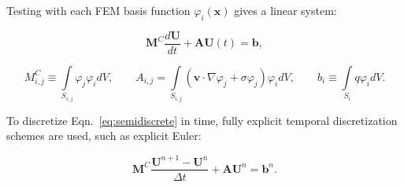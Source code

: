 Testing with each FEM basis function $\varphi_i(\mathbf{x})$ gives a linear system:

\begin{equation}\label{eq:semidiscrete}
      \mathbf{M}^C\frac{d\mathbf{U}}{dt}+\mathbf{A} \mathbf{U}(t) = \mathbf{b},
\end{equation}

\begin{equation}
	M^C_{i,j} \equiv \int\limits_{S_{i,j}}
    \varphi_j\varphi_i dV, \qquad
  A_{i,j} = \int\limits_{S_{i,j}}\left(
   \mathbf{v}\cdot\nabla\varphi_j +
   \sigma\varphi_j\right)\varphi_i dV, \qquad
	b_i \equiv \int\limits_{S_i} q\varphi_i dV.
\end{equation}

To discretize Eqn.~\ref{eq:semidiscrete} in time, fully explicit
temporal discretization schemes are used, such as explicit Euler:

\begin{equation}\label{eq:exgalerkin}
   \mathbf{M}^C\frac{\mathbf{U}^{n+1}-\mathbf{U}^n}{\Delta t}
     + \mathbf{A}\mathbf{U}^n = \mathbf{b}^n.
\end{equation}
